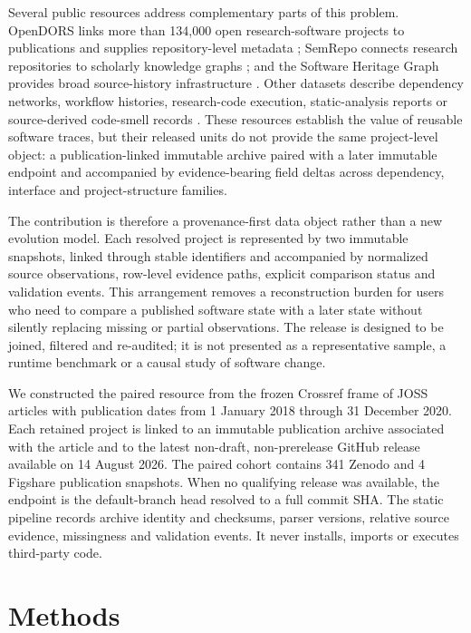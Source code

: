 \documentclass[10pt,a4paper]{article}
\begin{document}
Several public resources address complementary parts of this problem. OpenDORS links more than 134,000 open research-software projects to publications and supplies repository-level metadata \cite{druskat2025opendors}; SemRepo connects research repositories to scholarly knowledge graphs \cite{rafay2026semrepo}; and the Software Heritage Graph provides broad source-history infrastructure \cite{pietri2019softwareheritage}. Other datasets describe dependency networks, workflow histories, research-code execution, static-analysis reports or source-derived code-smell records \cite{schueller2022rust,cardoen2024actions,trisovic2022researchcode,koszo2025static,alomari2025smellycode}. These resources establish the value of reusable software traces, but their released units do not provide the same project-level object: a publication-linked immutable archive paired with a later immutable endpoint and accompanied by evidence-bearing field deltas across dependency, interface and project-structure families.

The contribution is therefore a provenance-first data object rather than a new evolution model. Each resolved project is represented by two immutable snapshots, linked through stable identifiers and accompanied by normalized source observations, row-level evidence paths, explicit comparison status and validation events. This arrangement removes a reconstruction burden for users who need to compare a published software state with a later state without silently replacing missing or partial observations. The release is designed to be joined, filtered and re-audited; it is not presented as a representative sample, a runtime benchmark or a causal study of software change.

We constructed the paired resource from the frozen Crossref frame of JOSS articles with publication dates from 1 January 2018 through 31 December 2020. Each retained project is linked to an immutable publication archive associated with the article and to the latest non-draft, non-prerelease GitHub release available on 14 August 2026. The paired cohort contains 341 Zenodo and 4 Figshare publication snapshots. When no qualifying release was available, the endpoint is the default-branch head resolved to a full commit SHA. The static pipeline records archive identity and checksums, parser versions, relative source evidence, missingness and validation events. It never installs, imports or executes third-party code.

\section{Methods}
\end{document}
